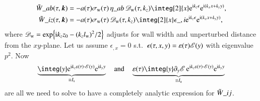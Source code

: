     \begin{equation}\label{eq:pertwalls:gws:Ft_SE_tensor_general}
        \begin{split}
            \Twf\_{ab}(\tau, \vec{k}) &=  -a (\tau)\sigma\ped{w}(\tau)  \, \eta\_{ab} \, \mathscr{D}\ped{w}(\tau,k_z) \integ[2]{x} \eu[\im k_z \epsilon] \eu[\im (k_x x+k_y y)], \\
            \Twf\_{iz}(\tau, \vec{k})
            &= -a (\tau)\sigma\ped{w}(\tau) \,\mathscr{D}\ped{w}(\tau, k_z)  \integ[2]{x} \epsilon\_{,i}  \eu[\im k_z \epsilon] \eu[\im (k_x x+k_y y)],%
         \end{split}
    \end{equation}
    where $\mathscr{D}_\mathrm{w}= \exp{ \ensuremath{\mathrm{i}}k_z z_0-{(k_z l\ensuremath{_\mathrm{w}})}^2/2 }$ adjusts for wall width and unperturbed distance from the $xy$-plane. %
    Let us assume $\epsilon_{,x}=0$ s.t.~$\epsilon(\tau,x,y)=\varepsilon(\tau)\mathscr{E}(y)$ with eigenvalue $p^2$. %
    Now
    \begin{equation}
        \underbrace{\integ{y} \eu[\im k_z \varepsilon(\tau) \cdot \sppt(y)] \eu[\im k_y y]}_{\equiv  I\ped{s}}  \quad \text{and}\quad %
        \underbrace{\varepsilon(\tau)\integ{y} \partial_y \sppt\, \eu[\im k_z \varepsilon(\tau) \cdot \sppt(y)] \eu[\im k_y y]}_{\equiv I\ped{a}}
    \end{equation}
    are all we need to solve to have a completely analytic expression for $\tilde{W}\_{ij}$.%

